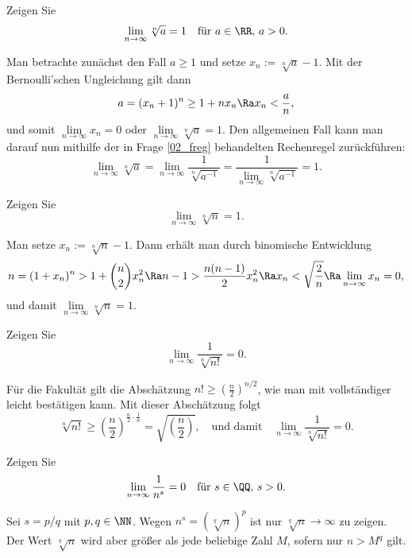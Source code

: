 \begin{frage}
  Zeigen Sie
  \[
  \lim_{n\to\infty} \sqrt[n]{a} = 1\quad\text{für $a\in\RR,\, a>0$.}
  \]
\end{frage}

\begin{antwort}
  Man betrachte zunächst den Fall $a \ge 1$ und setze
  $x_n := \sqrt[n]{a}-1$. Mit der Bernoulli'schen Ungleichung gilt dann 
  \[
  a = (x_n+1)^n \ge 1+nx_n \Ra x_n < \frac{a}{n}, 
  \]
  und somit $\lim\limits_{n\to \infty} x_n = 0$ oder $\lim\limits_{n\to\infty} 
  \sqrt[n]{a}=1$. Den allgemeinen Fall kann man darauf nun 
  mithilfe der in Frage \ref{02_freg} behandelten Rechenregel 
   zurückführen: 
  \[
  \lim_{n\to\infty} \sqrt[n]{a} = \lim_{n\to\infty}\frac{1}{\sqrt[n]{a^{-1}}} = 
  \frac{1}{\lim\limits_{n\to\infty} \sqrt[n]{a^{-1}}} = 1. 
  \]
\end{antwort}

\begin{frage}
  Zeigen Sie
  \[
  \lim_{n\to\infty} \sqrt[n]{n}=1.
  \]
\end{frage}

\begin{antwort}
  Man setze $x_n:= \sqrt[n]{n}-1$. Dann erhält man durch binomische Entwicklung 
  \[
  n=(1+x_n)^n > 1+ \binom{n}{2}x_n^2 \Ra n-1 > \frac{n(n-1)}{2}x_n^2 
  \Ra x_n < \sqrt{\frac{2}{n}} 
  \Ra \lim_{n\to\infty} x_n =0, 
  \]
  und damit  $\lim\limits_{n\to\infty} \sqrt[n]{n}=1$.
\end{antwort}

\begin{frage}
  Zeigen Sie
  \[
  \lim_{n\to\infty} \frac{1}{\sqrt[n]{n!}} = 0.
  \]
\end{frage}


\begin{antwort}
  Für die Fakultät gilt die Abschätzung 
  $n! \ge \left(\frac{n}{2}\right)^{n/2}$, wie man mit vollständiger 
  leicht bestätigen kann. Mit dieser Abschätzung folgt  
  \[
  \sqrt[n]{n!} \ge   \left( \frac{n}{2} \right)^{
    \frac{n}{2}\cdot\frac{1}{n}} = 
  \sqrt{ \left( \frac{n}{2} \right ) }, \quad\text{und damit}
  \quad
  \lim\limits_{n\to\infty} \frac{1}{\sqrt[n]{n!}} =0.
  \]
\end{antwort}


\begin{frage}
  Zeigen Sie
  \[
  \lim_{n\to\infty} \frac{1}{n^s}=0\quad\text{für $s\in\QQ,\, s>0$}.
  \]
\end{frage}

\begin{antwort}
  Sei $s=p/q$ mit $p,q \in \NN$. Wegen $n^s=\left( \sqrt[q]{n} \right)^p$ 
  ist nur $\sqrt[q]{n} \to \infty $ zu zeigen. Der Wert 
  $\sqrt[q]{n}$ wird aber größer als jede beliebige Zahl $M$, sofern nur 
  $n>M^q$ gilt. 
\end{antwort}


